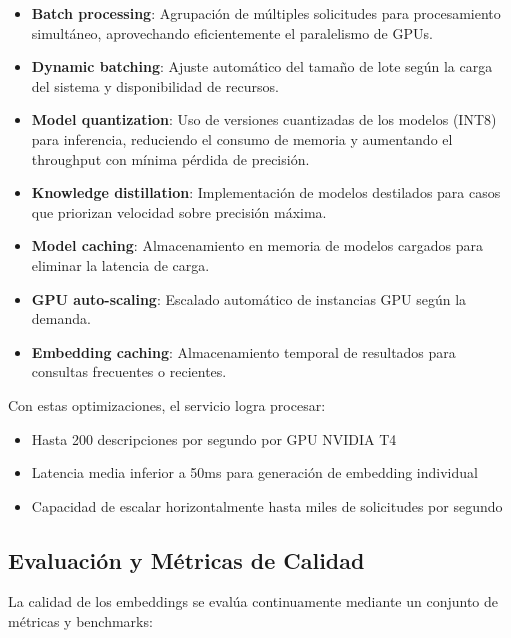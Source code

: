 \documentclass[12pt,a4paper]{article}
\begin{document}
\begin{itemize}
    \item \textbf{Batch processing}: Agrupación de múltiples solicitudes para procesamiento simultáneo, aprovechando eficientemente el paralelismo de GPUs.
    
    \item \textbf{Dynamic batching}: Ajuste automático del tamaño de lote según la carga del sistema y disponibilidad de recursos.
    
    \item \textbf{Model quantization}: Uso de versiones cuantizadas de los modelos (INT8) para inferencia, reduciendo el consumo de memoria y aumentando el throughput con mínima pérdida de precisión.
    
    \item \textbf{Knowledge distillation}: Implementación de modelos destilados para casos que priorizan velocidad sobre precisión máxima.
    
    \item \textbf{Model caching}: Almacenamiento en memoria de modelos cargados para eliminar la latencia de carga.
    
    \item \textbf{GPU auto-scaling}: Escalado automático de instancias GPU según la demanda.
    
    \item \textbf{Embedding caching}: Almacenamiento temporal de resultados para consultas frecuentes o recientes.
\end{itemize}

Con estas optimizaciones, el servicio logra procesar:
\begin{itemize}
    \item Hasta 200 descripciones por segundo por GPU NVIDIA T4
    \item Latencia media inferior a 50ms para generación de embedding individual
    \item Capacidad de escalar horizontalmente hasta miles de solicitudes por segundo
\end{itemize}

\subsection{Evaluación y Métricas de Calidad}
\label{subsec:es-evaluacion}

La calidad de los embeddings se evalúa continuamente mediante un conjunto de métricas y benchmarks:
\end{document}
